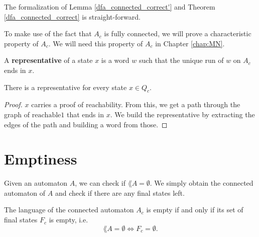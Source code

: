 The formalization of Lemma \ref{dfa_connected_correct'} and Theorem \ref{dfa_connected_correct} is straight-forward.



To make use of the fact that $A_c$ is fully connected, we will prove a characteristic property of $A_c$. 
We will need this property of $A_c$ in Chapter \ref{chap:MN}.


\begin{definition}
    A \textbf{representative} of a state $x$ is a word $w$ such that the unique run of $w$ on $A_c$ ends in $x$.
\end{definition}

\begin{lemma}
    \label{dfa_connected_repr}
    There is a representative for every state $x \in Q_c$.
\end{lemma}

\begin{proof}
    $x$ carries a proof of reachability.
    From this, we get a path through the graph of $\mathrm{reachable1}$ that ends in $x$.
    We build the representative by extracting the edges of the path and building a word from those.
\end{proof}





\section{Emptiness}

Given an automaton $A$, we can check if $\lang{A} = \emptyset$. We simply obtain the connected automaton of $A$ and check if there are any final states left. 

\begin{theorem}
    \label{dfa_lang_empty}
    The language of the connected automaton $A_c$ is empty if and only if its set of final states $F_c$ is empty, i.e.
    \begin{equation*}
        \lang{A} = \emptyset \iff F_c = \emptyset.
    \end{equation*}
\end{theorem}

